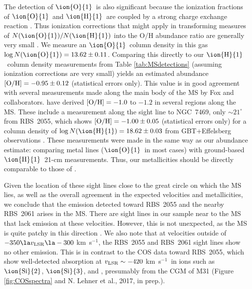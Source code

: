 \documentclass[12pt,preprint]{aastex6}
\newcommand{\MSmetallicity}{\ensuremath{-0.95\pm0.12}}
\newcommand{\HI}{\ensuremath{\mbox{\ion{H}{1}}}}
\newcommand{\OI}{\ensuremath{\mbox{\ion{O}{1}}}}
\newcommand{\SiII}{\ensuremath{\mbox{\ion{Si}{2}}}}
\newcommand{\SiIII}{\ensuremath{\mbox{\ion{Si}{3}}}}
\newcommand{\NHI}{\ensuremath{N(\mbox{\ion{H}{1}})}\relax}
\newcommand{\logNHI}{\ensuremath{\log N(\mbox{\ion{H}{1}})}\relax}
\newcommand{\kms}{km~s$^{-1}$}
\newcommand{\vlsr}{\ensuremath{v_{\rm LSR}\relax}}
\begin{document}
The detection of \OI\ is also significant because the ionization
fractions of \OI\ and \HI\ are coupled by a strong charge exchange
reaction \citep[e.g.,]{chambaud1980, stancil1999}. Thus ionization
corrections that might apply in transforming measures of
$N(\mbox{\OI})/\NHI$ into the O/H abundance ratio are generally very
small \citep[e.g.,][]{fox2013}. We measure an \OI\ column density in
this gas $\log N(\mbox{\OI}) = 13.62\pm0.11$. Comparing this directly
to our \HI\ column density measurements from Table
\ref{tab:MSdetections} (assuming ionization corrections are very
small) yields an estimated abundance $[{\rm O/H}] = \MSmetallicity$
(statistical errors only). This value is in good agreement with
several measurements made along the main body of the MS by Fox and
collaborators. \citet{fox2010,fox2013} have derived
$[{\rm O/H}] = -1.0$ to $-1.2$ in several regions along the MS. These
include a measurement along the sight line to NGC~7469, only
$\sim21^\circ$ from RBS~2055, which shows
$[{\rm O/H}] = -1.00 \pm 0.05$ (statistical errors only) for a column
density of $\logNHI = 18.62 \pm 0.03$ from GBT+Effelsberg observations
\citep{fox2013}. These measurements were made in the same way as our
abundance estimate: comparing metal lines (\OI\ in most cases) with
ground-based \HI\ 21-cm measurements. Thus, our metallicities should
be directly comparable to those of \citeauthor{fox2013}.

Given the location of these sight lines close to the great circle on
which the MS lies, as well as the overall agreement in the expected
velocities and metallicities, we conclude that the emission detected
toward RBS~2055 and the nearby RBS~2061 arises in the MS. There are
sight lines in our sample near to the MS that lack emission at these
velocities. However, this is not unexpected, as the MS is quite patchy
in this direction \citep[this region is referred to as the ``tip'' of
the MS by][]{nidever2010}. We also note that at velocities outside
of $-350 \la \vlsr \la -300$ \kms, the RBS~2055 and RBS~2061 sight
lines show no other emission. This is in contrast to the COS data
toward RBS~2055, which show well-detected absorption at
$\vlsr \sim-420$ \kms\ in ions such as \SiII, \SiIII, and ,
presumably from the CGM of M31 (Figure \ref{fig:COSspectra} and
N. Lehner et al., 2017, in prep.).
\end{document}
